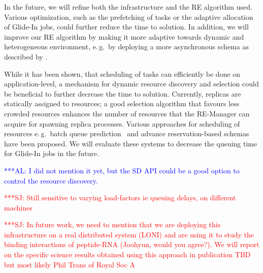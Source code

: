 \documentclass{rspublic}
\newcommand{\alnote}[1]{ {\textcolor{blue} { ***AL: #1 }}}
\newcommand{\jhanote}[1]{ {\textcolor{red} { ***SJ: #1 }}}
\newcommand{\alnote}[1]{}
\newcommand{\jhanote}[1]{}
\newcommand{\glidein}[1]{Glide-In }
\begin{document}
{%
   
In the future, we will refine both the infrastructure and the RE algorithm
used. Various optimization, such as the prefetching of tasks or the 
adaptive allocation of Glide-In jobs, could further reduce the time
to solution. In addition, we will improve our RE algorithm by making it
more adaptive towards dynamic and heterogeneous environment, 
e.\,g.\ by deploying  a more asynchronous schema
as described by \citet{Gallicchio:2007yq}.

While it has been shown, that scheduling of tasks can efficiently be done on 
application-level, a mechanism for dynamic resource discovery and selection 
could be beneficial to further decrease the time to solution. Currently, replicas are 
statically assigned to resources; a good selection algorithm that favours
less crowded resources enhances the number of resources that the RE-Manager
can acquire for spawning replica processes. Various approaches for 
scheduling of resources  e.\,g.\ batch queue 
prediction~\citep{1254939,Chakraborty:2008nx} and advance reservation-based 
schemas~\citep{Jeske:2007wj} have been proposed. We will evaluate these systems
to decrease the queuing time for Glide-In jobs in the future.


\alnote{I did not mention it yet, but the SD API could be a good option to control
the resource discovery.}



\jhanote{Still sensitive to varying load-factors ie queuing delays, 
  on different machines}

\jhanote{In future work, we need to mention that we are deploying this
  infrastructure on a real distributed system (LONI) and are using it
  to study the binding interactions of peptide-RNA (Joohyun, would you
  agree?). We will report on the specific science results obtained
  using this approach in publication TBD but most likely Phil Trans of
  Royal Soc A}

}
\end{document}
